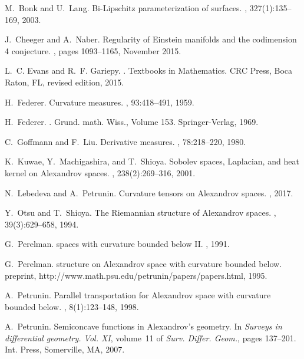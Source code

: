 \documentclass[12pt,leqno,intlimits]{amsart}
\numberwithin{equation}{section}
\theoremstyle{definition}
\theoremstyle{remark}
\begin{document}
\begin{thebibliography}{KMS01}
M.~Bonk and U.~Lang.
\newblock Bi-Lipschitz parameterization of surfaces.
, 327(1):135--169, 2003.

J.~Cheeger and A.~Naber.
\newblock Regularity of {Einstein} manifolds and the codimension 4 conjecture.
, pages 1093--1165, November 2015.

L.~C. Evans and R.~F. Gariepy.
.
\newblock Textbooks in Mathematics. CRC Press, Boca Raton, FL, revised edition,
2015.

H.~Federer.
\newblock Curvature measures.
, 93:418--491, 1959.

H.~Federer.
.
\newblock Grund. math. Wiss., Volume 153. Springer-Verlag, 1969.

C.~Goffmann and F.~Liu.
\newblock Derivative measures.
, 78:218--220, 1980.

K.~Kuwae, Y.~Machigashira, and T.~Shioya.
\newblock Sobolev spaces, {L}aplacian, and heat kernel on {A}lexandrov spaces.
, 238(2):269--316, 2001.

N.~Lebedeva and A.~Petrunin.
\newblock Curvature tensors on {Alexandrov} spaces.
, 2017.

Y.~Otsu and T.~Shioya.
\newblock The {R}iemannian structure of {A}lexandrov spaces.
, 39(3):629--658, 1994.

G.~Perelman.
 spaces with curvature bounded below {II}.
, 1991.

G.~Perelman.
 structure on {A}lexandrov space with curvature bounded below.
\newblock preprint, http://www.math.psu.edu/petrunin/papers/papers.html, 1995.

A.~Petrunin.
\newblock Parallel transportation for {A}lexandrov space with curvature bounded
below.
, 8(1):123--148, 1998.

A.~Petrunin.
\newblock Semiconcave functions in {A}lexandrov's geometry.
\newblock In {\em Surveys in differential geometry. {V}ol. {XI}}, volume~11 of
{\em Surv. Differ. Geom.}, pages 137--201. Int. Press, Somerville, MA, 2007.


\end{thebibliography}
\end{document}

